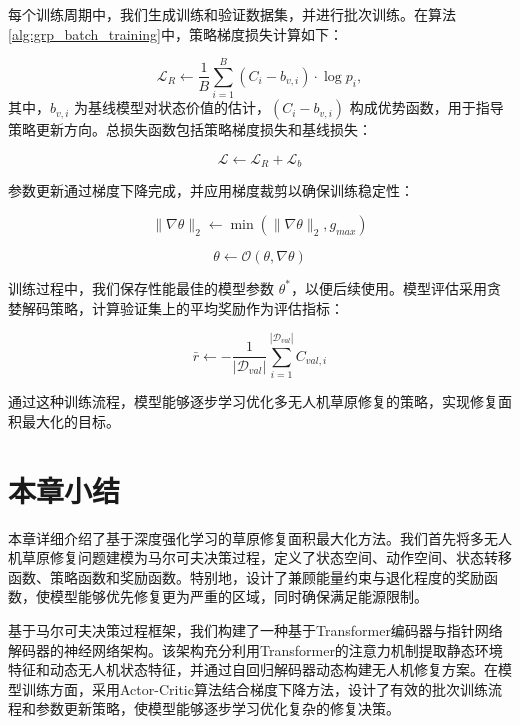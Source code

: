 \documentclass[AutoFakeBold]{LZUThesis}
\begin{document}
每个训练周期中，我们生成训练和验证数据集，并进行批次训练。在算法\ref{alg:grp_batch_training}中，策略梯度损失计算如下：

\begin{equation}
	\mathcal{L}_{R} \leftarrow \frac{1}{B}\sum_{i=1}^{B}(C_i - b_{v,i}) \cdot \log p_i,
\end{equation}
其中，$b_{v,i}$ 为基线模型对状态价值的估计，$(C_i - b_{v,i})$ 构成优势函数，用于指导策略更新方向。总损失函数包括策略梯度损失和基线损失：

\begin{equation}
	\mathcal{L} \leftarrow \mathcal{L}_{R} + \mathcal{L}_{b}
\end{equation}

参数更新通过梯度下降完成，并应用梯度裁剪以确保训练稳定性：

\begin{equation}
	\|\nabla\theta\|_2 \leftarrow \min(\|\nabla\theta\|_2, g_{max})
\end{equation}

\begin{equation}
	\theta \leftarrow \mathcal{O}(\theta, \nabla\theta)
\end{equation}

训练过程中，我们保存性能最佳的模型参数 $\theta^*$，以便后续使用。模型评估采用贪婪解码策略，计算验证集上的平均奖励作为评估指标：

\begin{equation}
	\bar{r} \leftarrow -\frac{1}{|\mathcal{D}_{val}|}\sum_{i=1}^{|\mathcal{D}_{val}|} C_{val,i}
\end{equation}

通过这种训练流程，模型能够逐步学习优化多无人机草原修复的策略，实现修复面积最大化的目标。

\section{本章小结}

本章详细介绍了基于深度强化学习的草原修复面积最大化方法。我们首先将多无人机草原修复问题建模为马尔可夫决策过程，定义了状态空间、动作空间、状态转移函数、策略函数和奖励函数。特别地，设计了兼顾能量约束与退化程度的奖励函数，使模型能够优先修复更为严重的区域，同时确保满足能源限制。

基于马尔可夫决策过程框架，我们构建了一种基于Transformer编码器与指针网络解码器的神经网络架构。该架构充分利用Transformer的注意力机制提取静态环境特征和动态无人机状态特征，并通过自回归解码器动态构建无人机修复方案。在模型训练方面，采用Actor-Critic算法结合梯度下降方法，设计了有效的批次训练流程和参数更新策略，使模型能够逐步学习优化复杂的修复决策。
\end{document}
